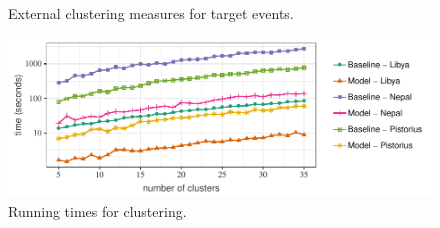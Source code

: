 \begin{figure}
\caption{External clustering measures for target events.}
\label{fig:results}
\end{figure}

\begin{figure}
  \centering
  \includegraphics[width=.478\textwidth]{figures/url-model/times}
  \caption{Running times for clustering.}\label{fig:times}
\end{figure}%